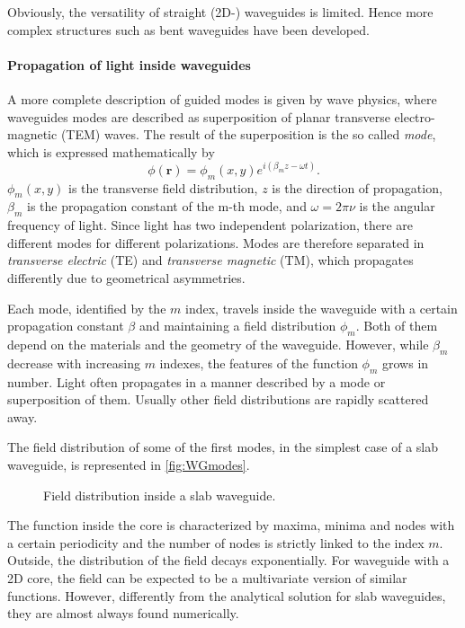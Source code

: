 Obviously, the versatility of straight (2D-) waveguides is limited.
Hence more complex structures such as bent waveguides have been developed.

\paragraph{Propagation of light inside waveguides\\}
\noindent A more complete description of guided modes is given by wave physics, where waveguides modes are described as superposition of planar transverse electro-magnetic (TEM) waves.
The result of the superposition is the so called \textit{mode}, which is expressed mathematically by
\begin{equation}
	\phi(\textbf{r}) = \phi_m\left( x, y \right) e^{i\left( \beta_m z - \omega t \right)}.
	\label{eq:mode_propagation}
\end{equation}
$\phi_m\left( x, y \right)$ is the transverse field distribution, $z$ is the direction of propagation, $\beta_m$ is the propagation constant of the m-th mode, and $\omega=2\pi \nu$ is the angular frequency of light.
Since light has two independent polarization, there are different modes for different polarizations.
Modes are therefore separated in \textit{transverse electric} (TE) and \textit{transverse magnetic} (TM), which propagates differently due to geometrical asymmetries.

Each mode, identified by the $m$ index, travels inside the waveguide with a certain propagation constant $\beta$ and maintaining a field distribution $\phi_m$.
Both of them depend on the materials and the geometry of the waveguide.
However, while $\beta_m$ decrease with increasing $m$ indexes, the features of the function $\phi_m$ grows in number.
Light often propagates in a manner described by a mode or superposition of them.
Usually other field distributions are rapidly scattered away.%

The field distribution of some of the first modes, in the simplest case of a slab waveguide, is represented in \autoref{fig:WGmodes}.
\begin{figure}[ht]
	\centering
	
	\caption{Field distribution inside a slab waveguide.}
	\label{fig:WGmodes}
\end{figure}
The function inside the core is characterized by maxima, minima and nodes with a certain periodicity and the number of nodes is strictly linked to the index $m$.
Outside, the distribution of the field decays exponentially.
For waveguide with a 2D core, the field can be expected to be a multivariate version of similar functions.
However, differently from the analytical solution for slab waveguides, they are almost always found numerically.

